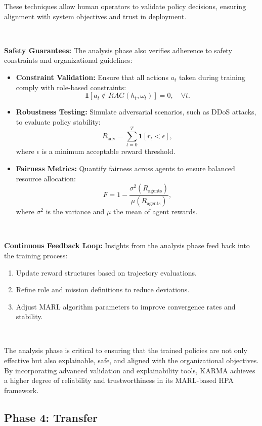\documentclass[conference]{IEEEtran}
\begin{document}
These techniques allow human operators to validate policy decisions, ensuring alignment with system objectives and trust in deployment.

\

\noindent\textbf{Safety Guarantees:} 
The analysis phase also verifies adherence to safety constraints and organizational guidelines:
\begin{itemize}
    \item \textbf{Constraint Validation:} Ensure that all actions \( a_t \) taken during training comply with role-based constraints:
    \[
    \mathbf{1}[a_t \notin RAG(h_t, \omega_t)] = 0, \quad \forall t.
    \]
    \item \textbf{Robustness Testing:} Simulate adversarial scenarios, such as DDoS attacks, to evaluate policy stability:
    \[
    R_{\text{adv}} = \sum_{t=0}^T \mathbf{1}[r_t < \epsilon],
    \]
    where \( \epsilon \) is a minimum acceptable reward threshold.
    \item \textbf{Fairness Metrics:} Quantify fairness across agents to ensure balanced resource allocation:
    \[
    F = 1 - \frac{\sigma^2(R_{\text{agents}})}{\mu(R_{\text{agents}})},
    \]
    where \( \sigma^2 \) is the variance and \( \mu \) the mean of agent rewards.
\end{itemize}

\

\noindent\textbf{Continuous Feedback Loop:}
Insights from the analysis phase feed back into the training process:
\begin{enumerate}
    \item Update reward structures based on trajectory evaluations.
    \item Refine role and mission definitions to reduce deviations.
    \item Adjust MARL algorithm parameters to improve convergence rates and stability.
\end{enumerate}

\

The analysis phase is critical to ensuring that the trained policies are not only effective but also explainable, safe, and aligned with the organizational objectives. By incorporating advanced validation and explainability tools, KARMA achieves a higher degree of reliability and trustworthiness in its MARL-based HPA framework.


\subsection{Phase 4: Transfer}
\end{document}
